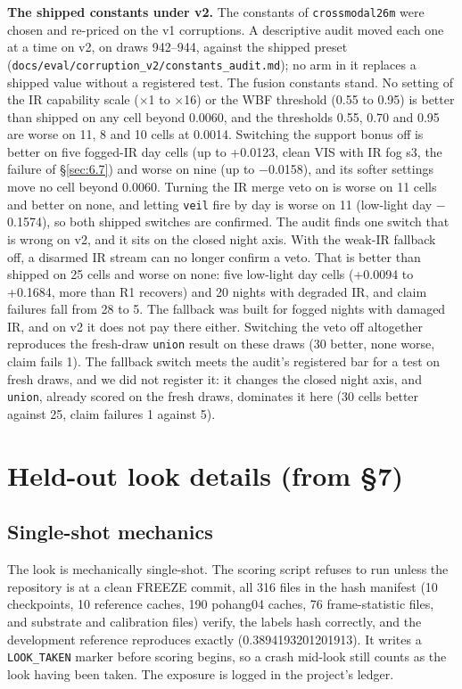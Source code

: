 \documentclass[10pt]{article}
\begin{document}
\textbf{The shipped constants under v2.} The constants of \texttt{crossmodal26m} were chosen and re-priced on the v1 corruptions. A descriptive audit moved each one at a time on v2, on draws 942--944, against the shipped preset (\texttt{docs/\allowbreak{}eval/\allowbreak{}corruption\_\allowbreak{}v2/\allowbreak{}constants\_\allowbreak{}audit.md}); no arm in it replaces a shipped value without a registered test. The fusion constants stand. No setting of the IR capability scale ($\times$1 to $\times$16) or the WBF threshold (0.55 to 0.95) is better than shipped on any cell beyond 0.0060, and the thresholds 0.55, 0.70 and 0.95 are worse on 11, 8 and 10 cells at 0.0014. Switching the support bonus off is better on five fogged-IR day cells (up to +0.0123, clean VIS with IR fog s3, the failure of \S\ref{sec:6.7}) and worse on nine (up to $-$0.0158), and its softer settings move no cell beyond 0.0060. Turning the IR merge veto on is worse on 11 cells and better on none, and letting \texttt{veil} fire by day is worse on 11 (low-light day $-$0.1574), so both shipped switches are confirmed. The audit finds one switch that is wrong on v2, and it sits on the closed night axis. With the weak-IR fallback off, a disarmed IR stream can no longer confirm a veto. That is better than shipped on 25 cells and worse on none: five low-light day cells (+0.0094 to +0.1684, more than R1 recovers) and 20 nights with degraded IR, and claim failures fall from 28 to 5. The fallback was built for fogged nights with damaged IR, and on v2 it does not pay there either. Switching the veto off altogether reproduces the fresh-draw \texttt{union} result on these draws (30 better, none worse, claim fails 1). The fallback switch meets the audit's registered bar for a test on fresh draws, and we did not register it: it changes the closed night axis, and \texttt{union}, already scored on the fresh draws, dominates it here (30 cells better against 25, claim failures 1 against 5).

\FloatBarrier
\section{Held-out look details (from \S7)}\label{app:K}
\subsection{Single-shot mechanics}\label{app:K.1}
The look is mechanically single-shot. The scoring script refuses to run unless the repository is at a clean FREEZE commit, all 316 files in the hash manifest (10 checkpoints, 10 reference caches, 190 pohang04 caches, 76 frame-statistic files, and substrate and calibration files) verify, the labels hash correctly, and the development reference reproduces exactly (0.3894193201201913). It writes a \texttt{LOOK\_\allowbreak{}TAKEN} marker before scoring begins, so a crash mid-look still counts as the look having been taken. The exposure is logged in the project's ledger.
\end{document}
